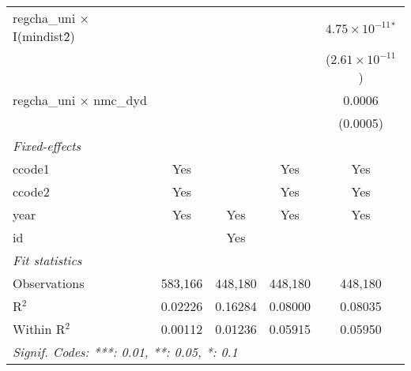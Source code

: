 \begin{tabular}{lcccc}
   regcha\_uni $\times$ I(mindist\^2)    &                &                         &                                & $4.75\times 10^{-11}$$^{*}$\\    
                                         &                &                         &                                & ($2.61\times 10^{-11}$)\\    
   regcha\_uni $\times$ nmc\_dyd         &                &                         &                                & 0.0006\\   
                                         &                &                         &                                & (0.0005)\\   
   \midrule
   \emph{Fixed-effects}\\
   ccode1                                & Yes            &                         & Yes                            & Yes\\  
   ccode2                                & Yes            &                         & Yes                            & Yes\\  
   year                                  & Yes            & Yes                     & Yes                            & Yes\\  
   id                                    &                & Yes                     &                                & \\  
   \midrule
   \emph{Fit statistics}\\
   Observations                          & 583,166        & 448,180                 & 448,180                        & 448,180\\  
   R$^2$                                 & 0.02226        & 0.16284                 & 0.08000                        & 0.08035\\  
   Within R$^2$                          & 0.00112        & 0.01236                 & 0.05915                        & 0.05950\\  
   \midrule \midrule
   \multicolumn{5}{l}{\emph{Signif. Codes: ***: 0.01, **: 0.05, *: 0.1}}\\
\end{tabular}
\par\endgroup



